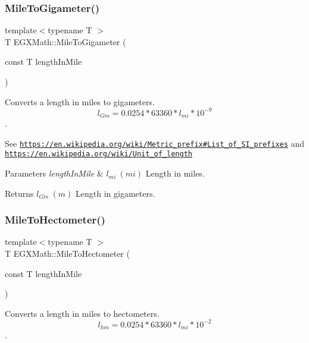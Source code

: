 \subsubsection{\texorpdfstring{Mile\+To\+Gigameter()}{MileToGigameter()}}
{\footnotesize\ttfamily template$<$typename T $>$ \\
T E\+G\+X\+Math\+::\+Mile\+To\+Gigameter (\begin{DoxyParamCaption}\item[{const T}]{length\+In\+Mile }\end{DoxyParamCaption})}



Converts a length in miles to gigameters. \[ l_{Gm}=0.0254 * 63360 * l_{mi} * 10^{-9} \]. 

See \href{https://en.wikipedia.org/wiki/Metric_prefix#List_of_SI_prefixes}{\tt https\+://en.\+wikipedia.\+org/wiki/\+Metric\+\_\+prefix\#\+List\+\_\+of\+\_\+\+S\+I\+\_\+prefixes} and \href{https://en.wikipedia.org/wiki/Unit_of_length}{\tt https\+://en.\+wikipedia.\+org/wiki/\+Unit\+\_\+of\+\_\+length} 
\begin{DoxyParams}{Parameters}
{\em length\+In\+Mile} & $ l_{mi}\ (mi)$ Length in miles. \\
\hline
\end{DoxyParams}
\begin{DoxyReturn}{Returns}
$ l_{Gm}\ (m)$ Length in gigameters. 
\end{DoxyReturn}
\mbox{\label{group___e_g_x_math-_conversions-_length_conversions-_imperial-_mile-_s_i_ga34d371b17e63e2ed83787eab65b8dab9}} 
\subsubsection{\texorpdfstring{Mile\+To\+Hectometer()}{MileToHectometer()}}
{\footnotesize\ttfamily template$<$typename T $>$ \\
T E\+G\+X\+Math\+::\+Mile\+To\+Hectometer (\begin{DoxyParamCaption}\item[{const T}]{length\+In\+Mile }\end{DoxyParamCaption})}



Converts a length in miles to hectometers. \[ l_{hm}=0.0254 * 63360 * l_{mi} * 10^{-2} \]. 

